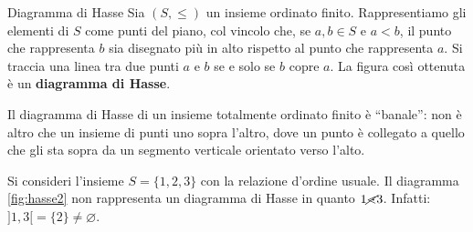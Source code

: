 \begin{defbox}{Diagramma di Hasse}
	Sia $(S,\leq)$ un insieme ordinato finito. Rappresentiamo gli elementi di $S$ come punti del piano, col vincolo che, se $a,b \in S$ e $a <b$, il punto che rappresenta $b$ sia disegnato più in alto rispetto al punto che rappresenta $a$. Si traccia una linea tra due punti $a$ e $b$ se e solo se $b$ copre $a$. La figura così ottenuta è un \textbf{diagramma di Hasse}.
\end{defbox}

\begin{osservation}
	Il diagramma di Hasse di un insieme totalmente ordinato finito è ``banale'': non è altro	che un insieme di punti uno sopra l’altro, dove un punto è collegato a quello che gli sta sopra da un segmento verticale orientato verso l’alto.
\end{osservation}

\begin{center}
\end{center}

\begin{example}
	 Si consideri l'insieme $S=\{1,2,3\}$ con la relazione d'ordine usuale. Il diagramma \ref{fig:hasse2} non rappresenta un diagramma di Hasse in quanto $1 \cancel{\lessdot} 3$. Infatti: $] 1,3[ = \{2\} \neq \varnothing$.
	
	\begin{center}
			\label{fig:hasse2}
	\end{center}
\end{example}

